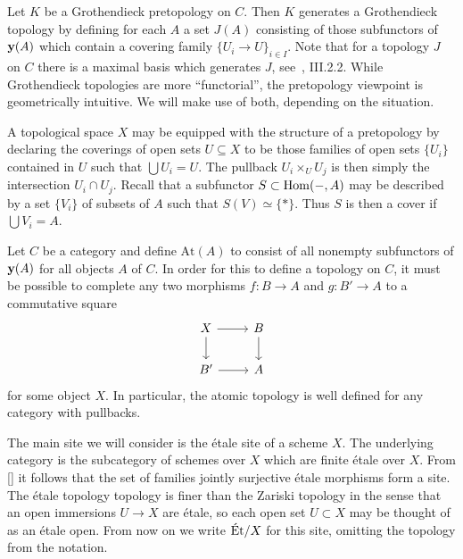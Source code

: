 Let $K$ be a Grothendieck pretopology on $C$. Then $K$ generates a Grothendieck topology by defining for each $A$ a set $J(A)$ consisting of those subfunctors of $\mathbf{y}(A)$ which contain a covering family $\{U_i \to U\}_{i \in I}$. Note that for a topology $J$ on $C$ there is a maximal basis which generates $J$, see~\cite{SIGL}, III.2.2. While Grothendieck topologies are more ``functorial'', the pretopology viewpoint is geometrically intuitive. We will make use of both, depending on the situation.

\begin{example}
	A topological space $X$ may be equipped with the structure of a pretopology by declaring the coverings of open sets $U \subseteq X$ to be those families of open sets $\{U_i\}$ contained in $U$ such that $\displaystyle\bigcup U_i = U$. The pullback $U_i \times_U U_j$ is then simply the intersection $U_i \cap U_j$. Recall that a subfunctor $S \subset \operatorname{Hom}(-,A)$ may be described by a set $\{V_i\}$ of subsets of $A$ such that $S(V) \simeq \{*\}$. Thus $S$  is then a cover if $\bigcup V_i = A$.
\end{example}

\begin{example}
	Let $C$ be a category and define $\text{At}(A)$ to consist of all nonempty subfunctors of $\mathbf{y}(A)$ for all objects $A$ of $C$. In order for this to define a topology on $C$, it must be possible to complete any two morphisms $f \colon  B \to A$ and $g \colon B' \to A$ to a commutative square
	\[
		\begin{tikzcd}
			X & B \\
			B' & A
			\arrow[from=1-1, to=2-1]
			\arrow[from=1-1, to=1-2]
			\arrow[from=1-2, to=2-2]
			\arrow[from=2-1, to=2-2]
		\end{tikzcd}
	\]
	for some object $X$. In particular, the atomic topology is well defined for any category with pullbacks.
\end{example}

\begin{example}
	The main site we will consider is the \'etale site of a scheme $X$. The underlying category is the subcategory of schemes over $X$ which are finite \'etale over $X$. From \ref{} it follows that the set of families jointly surjective \'etale morphisms form a site. The \'etale topology topology is finer than the Zariski topology in the sense that an open immersions $U \to X$ are \'etale, so each open set $U \subset X$ may be thought of as an \'etale open. From now on we write $\text{\'Et}/X$ for this site, omitting the topology from the notation.
\end{example}

